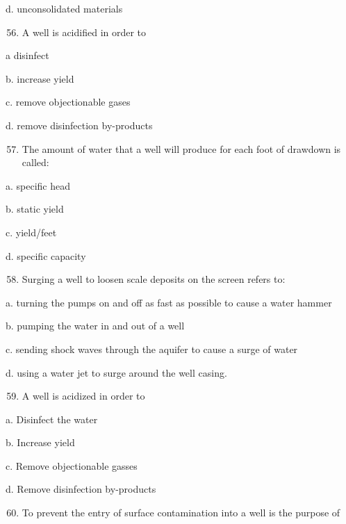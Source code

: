 \documentclass[10pt]{article}
\begin{document}
d. unconsolidated materials

\begin{enumerate}
  \setcounter{enumi}{55}
  \item A well is acidified in order to
\end{enumerate}

a disinfect

b. increase yield

c. remove objectionable gases

d. remove disinfection by-products

\begin{enumerate}
  \setcounter{enumi}{56}
  \item The amount of water that a well will produce for each foot of drawdown is called:
\end{enumerate}

a. specific head

b. static yield

c. yield/feet

d. specific capacity

\begin{enumerate}
  \setcounter{enumi}{57}
  \item Surging a well to loosen scale deposits on the screen refers to:
\end{enumerate}

a. turning the pumps on and off as fast as possible to cause a water hammer

b. pumping the water in and out of a well

c. sending shock waves through the aquifer to cause a surge of water

d. using a water jet to surge around the well casing.

\begin{enumerate}
  \setcounter{enumi}{58}
  \item A well is acidized in order to
\end{enumerate}

a. Disinfect the water

b. Increase yield

c. Remove objectionable gasses

d. Remove disinfection by-products

\begin{enumerate}
  \setcounter{enumi}{59}
  \item To prevent the entry of surface contamination into a well is the purpose of
\end{enumerate}
\end{document}
